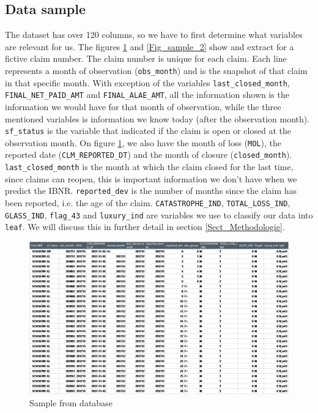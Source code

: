 	\subsection{Data sample}
	The dataset has over 120 columns, so we have to first determine what variables are relevant for us.  The figures  \ref{Fig_sample_1} and  \ref{Fig_sample_2} show and extract for a fictive claim number. The claim number is unique for each claim. Each line represents a month of observation (\texttt{obs\_month}) and is the snapshot of that claim in that specific month. With exception of the variables \texttt{last\_closed\_month}, \texttt{FINAL\_NET\_PAID\_AMT} and \texttt{FINAL\_ALAE\_AMT}, all the information shown is the information we would have for that month of observation, while the three mentioned variables is information we know today (after the observation month). \texttt{sf\_status} is the variable that indicated if the claim is open or closed at the observation month. On figure \ref{Fig_sample_1}, we also have the month of loss (\texttt{MOL}), the reported date (\texttt{CLM\_REPORTED\_DT}) and the month of closure (\texttt{closed\_month}). \texttt{last\_closed\_month} is the month at which the claim closed for the last time, since claims can reopen, this is important information we don’t have when we predict the IBNR.  \texttt{reported\_dev} is the number of months since the claim has been reported, i.e. the age of the claim. \texttt{CATASTROPHE\_IND}, \texttt{TOTAL\_LOSS\_IND}, \texttt{GLASS\_IND}, \texttt{flag\_43} and \texttt{luxury\_ind} are variables we use to classify our data into \texttt{leaf}. We will discuss this in further detail in section \ref{Sect_Methodologie}. 
	
	\begin{figure}[H]
		\begin{center}
			\includegraphics[scale=0.4]{Graphiques/sample_1} 
			\renewcommand{\figurename}{Figure}
			\caption{Sample from database}\label{Fig_sample_1}
		\end{center}
	\end{figure}
	
